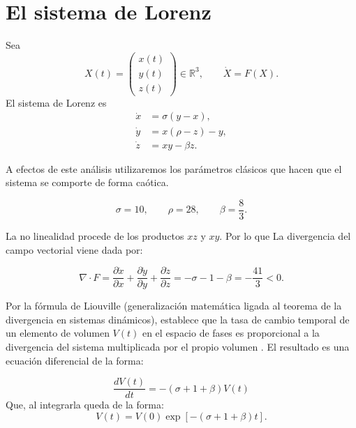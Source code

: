 \documentclass[12pt,a4paper,oneside]{report}
\numberwithin{equation}{chapter}
\newcommand{\R}{\mathbb{R}}
\begin{document}
\chapter{El sistema de Lorenz}

Sea
\[
    X(t)= \begin{pmatrix} x(t)\\y(t)\\z(t) \end{pmatrix}\in\R^3, \qquad \dot X=F(X).
\]
El sistema de Lorenz es
\begin{equation}
    \boxed{
    \begin{aligned}
        \dot x &= \sigma(y-x),\\
        \dot y &= x(\rho-z)-y,\\
        \dot z &= xy-\beta z.
    \end{aligned}}
    \label{eq:lorenz}
\end{equation}

A efectos de este análisis utilizaremos los parámetros clásicos que hacen que el sistema se comporte de forma caótica.

\begin{equation}
    \sigma=10,\qquad \rho=28,\qquad \beta=\frac83.
\end{equation}

La no linealidad procede de los productos \(xz\) y \(xy\). Por lo que La divergencia del campo vectorial viene dada por:

\begin{equation}
    \nabla\cdot F = \frac{\partial\dot x}{\partial x} +\frac{\partial\dot y}{\partial y} +\frac{\partial\dot z}{\partial z} =-\sigma-1-\beta=-\frac{41}{3}<0.
\end{equation}

Por la fórmula de Liouville  (generalización matemática ligada al teorema de la divergencia en sistemas dinámicos), establece que la tasa de cambio temporal de un elemento de volumen \(V(t)\) en el espacio de fases es proporcional a la divergencia del sistema multiplicada por el propio volumen \cite{Ehrendorfer2003}. 
El resultado es una ecuación diferencial de la forma:

\begin{equation}
    \frac{dV(t)}{dt} = -(\sigma + 1+ \beta)V(t)    
\end{equation}
Que, al integrarla queda de la forma:
\begin{equation}
    V(t)=V(0)\exp\left[-(\sigma+1+\beta)t\right].
\end{equation}
\end{document}
